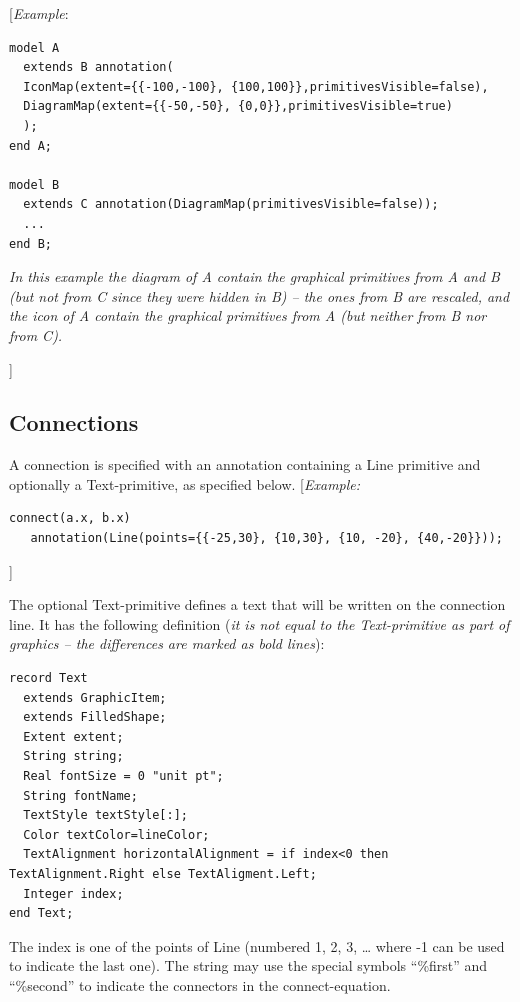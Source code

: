 \documentclass[10pt,a4paper]{report}
\def\doublelabel#1{\label{#1}}
\begin{document}
{[}\emph{Example}:

\begin{lstlisting}[language=modelica]
model A
  extends B annotation(
  IconMap(extent={{-100,-100}, {100,100}},primitivesVisible=false),
  DiagramMap(extent={{-50,-50}, {0,0}},primitivesVisible=true)
  );
end A;

model B
  extends C annotation(DiagramMap(primitivesVisible=false));
  ...
end B;
\end{lstlisting}
\emph{In this example the diagram of A contain the graphical primitives
from A and B (but not from C since they were hidden in B) -- the ones
from B are rescaled, and the icon of A contain the graphical primitives
from A (but neither from B nor from C).}

{]}

\subsection{Connections}\doublelabel{connections1}

A connection is specified with an annotation containing a Line primitive
and optionally a Text-primitive, as specified below. {[}\emph{Example:}
\begin{lstlisting}[language=modelica]
  connect(a.x, b.x)
   annotation(Line(points={{-25,30}, {10,30}, {10, -20}, {40,-20}})); 
\end{lstlisting}

{]}

The optional Text-primitive defines a text that will be written on the
connection line. It has the following definition (\emph{it is not equal
to the Text-primitive as part of graphics -- the differences are marked as bold lines}):
\begin{lstlisting}[language=modelica,escapechar=!,emph={horizontalAlignment,string,index}, emphstyle=\textbf]
record Text
  extends GraphicItem;
  extends FilledShape;
  Extent extent;
  String string;
  Real fontSize = 0 "unit pt";
  String fontName;
  TextStyle textStyle[:];
  Color textColor=lineColor;
  TextAlignment horizontalAlignment = if index<0 then TextAlignment.Right else TextAligment.Left;
  Integer index;
end Text;
\end{lstlisting}

The index is one of the points of Line (numbered 1, 2, 3, \ldots{} where
-1 can be used to indicate the last one). The string may use the special
symbols ``\%first'' and ``\%second'' to indicate the connectors in the
connect-equation.
\end{document}
